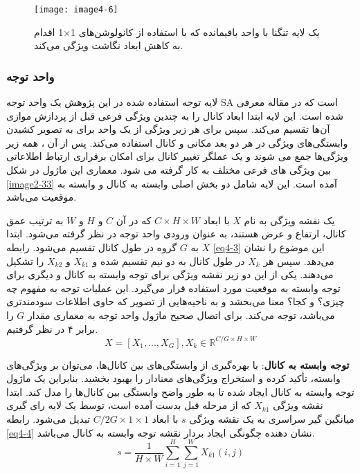 \begin{figure}[h]
\centering
  \texttt{[image: image4-6]}
  \caption{یک لایه تنگنا با واحد باقیمانده که با استفاده از کانولوشن‌های 1×1 اقدام به کاهش ابعاد نگاشت ویژگی می‌کند.}
  \label{image4-6}
\end{figure}

\subsubsection{واحد توجه}
لایه توجه استفاده شده در این پژوهش یک واحد توجه SA  است که در مقاله \cite{yang2021sanet} معرفی شده است. این لایه ابتدا ابعاد کانال را به چندین ویژگی فرعی قبل از پردازش موازی آن‌ها تقسیم می‌کند. سپس برای هر زیر ویژگی از یک واحد  برای به تصویر کشیدن وابستگی‌های ویژگی در هر دو بعد مکانی و کانال استفاده می‌کند. پس از آن ، همه زیر ویژگی‌ها جمع می شوند و یک عملگر تغییر کانال برای امکان برقراری ارتباط اطلاعاتی بین ویژگی های فرعی مختلف به کار گرفته می شود. معماری این ماژول در شکل \ref{image2-33} آمده است. این لایه شامل دو بخش اصلی وابسته به کانال  و وابسته به موقعیت  می‌باشد.

\noindent
یک نقشه ویژگی  به نام $X$ با ابعاد $C \times H \times W$ که در آن $C$ و $H$ و $W$ به ترتیب عمق کانال، ارتفاع و عرض هستند، به عنوان ورودی واحد توجه در نظر گرفته می‌شود. ابتدا $X$ به $G$ گروه در طول کانال تقسیم می‌شود. رابطه \ref{eq4-3} این موضوع را نشان می‌دهد. سپس هر $X_k$ در طول کانال به دو نیم تقسیم شده و $X_{k1}$ و $X_{k2}$ را تشکیل می‌دهند. یکی از این دو زیر نقشه ویژگی   برای توجه وابسته به کانال و دیگری برای توجه وابسته به موقعیت مورد استفاده قرار می‌گیرد. این عملیات توجه به مفهوم چه چیزی؟ و کجا؟ معنا می‌بخشد و به ناحیه‌هایی از تصویر که حاوی اطلاعات سودمندتری می‌باشد، توجه می‌کند. برای اتصال صحیح ماژول واحد توجه به معماری  مقدار $G$ را برابر ۴ در نظر گرفتیم.
\begin{equation}
X = [X_1, ..., X_G], X_k \in \mathbb{R}^{C/G \times H \times W}
\label{eq4-3}
\end{equation}

\noindent
\textbf{توجه  وابسته به کانال}: 
با بهره‌گیری از وابستگی‌های بین کانال‌ها، می‌توان بر ویژگی‌های وابسته، تأکید کرده و استخراج ویژگی‌های معنادار را بهبود بخشید. بنابراین یک ماژول توجه وابسته به کانال ایجاد شده تا به طور واضح وابستگی بین کانال‌ها را مدل کند. ابتدا نقشه ویژگی $X_{k1}$ که از مرحله قبل بدست آمده است، توسط یک لایه رای گیری میانگین گیر سراسری  به یک نقشه ویژگی $s$ با ابعاد $C/2G \times 1 \times 1$ تبدیل می‌شود. رابطه \ref{eq4-4} نشان دهنده چگونگی ایجاد بردار نقشه توجه وابسته به کانال می‌باشد. 
\begin{equation}
s = \frac{1}{H \times W}\sum_{i=1}^{H} \sum_{j=1}^{W} X_{k1} (i, j)
\label{eq4-4}
\end{equation}

